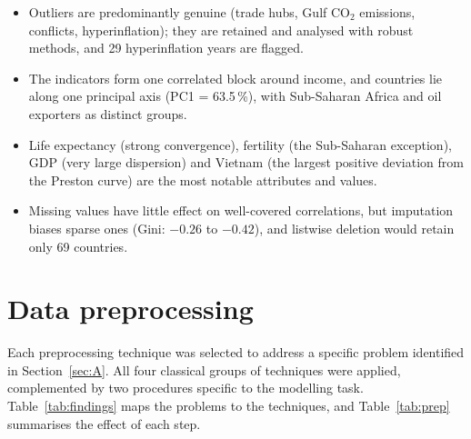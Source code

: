 \documentclass[11pt,a4paper]{article}
\begin{document}
\begin{summary}
\begin{itemize}
\item Outliers are predominantly genuine (trade hubs, Gulf CO$_2$ emissions, conflicts, hyperinflation); they are retained and analysed with robust methods, and 29 hyperinflation years are flagged.
\item The indicators form one correlated block around income, and countries lie along one principal axis (PC1 = 63.5\,\%), with Sub-Saharan Africa and oil exporters as distinct groups.
\item Life expectancy (strong convergence), fertility (the Sub-Saharan exception), GDP (very large dispersion) and Vietnam (the largest positive deviation from the Preston curve) are the most notable attributes and values.
\item Missing values have little effect on well-covered correlations, but imputation biases sparse ones (Gini: $-0.26$ to $-0.42$), and listwise deletion would retain only 69 countries.
\end{itemize}
\end{summary}

\section{Data preprocessing}\label{sec:B}
Each preprocessing technique was selected to address a specific problem identified in Section~\ref{sec:A}. All four classical groups of techniques \cite{han} were applied, complemented by two procedures specific to the modelling task. Table~\ref{tab:findings} maps the problems to the techniques, and Table~\ref{tab:prep} summarises the effect of each step.
\end{document}
